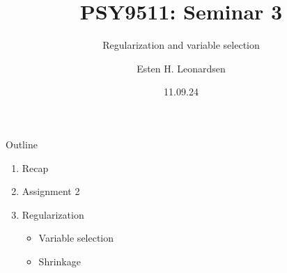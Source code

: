 \documentclass{beamer}
\title{PSY9511: Seminar 3}
\subtitle{Regularization and variable selection}
\author{Esten H. Leonardsen}
\date{11.09.24}
\begin{document}
	\begin{frame}
	 	\maketitle
	\end{frame}

    \begin{frame}{Outline}
        \centering
        \vfill
        \begin{enumerate}
            \item Recap
            \item Assignment 2
            \item Regularization
            \begin{itemize}
                \item Variable selection
                \item Shrinkage
            \end{itemize}
        \end{enumerate}
        \vfill
    \end{frame}

    
    
    


\end{document}
